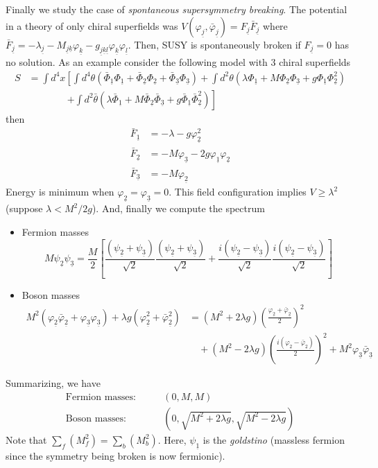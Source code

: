 \documentclass[a4paper,12pt]{article}
\numberwithin{equation}{section}
\numberwithin{exe}{section}
\newcommand{\Fb}{{\bar F}}
\newcommand{\ju}{{\underline j}}
\newcommand{\ku}{{\underline k}}
\newcommand{\lu}{{\underline l}}
\renewcommand{\u}[1]{{\underline #1}}
\renewcommand{\l}{{\lambda}}
\renewcommand{\t}{{\theta}}
\newcommand{\tb}{{\bar\theta}}
\newcommand{\vphi}{{\varphi}}
\newcommand{\vphib}{{\bar\varphi}}
\newcommand{\Phib}{{\bar \Phi}}
\begin{document}
Finally we study the case of {\it spontaneous supersymmetry breaking}. The potential in a theory of only chiral superfields was $V(\vphi_\ju,\vphib_\ju) = F_\ju \Fb_\ju$ where $\Fb_\ju = -\l_\ju - M_{\ju\ku}\vphi_\ku - g_{\ju\ku\lu}\vphi_\ku\vphi_\lu$. Then, SUSY is spontaneously broken if $F_\ju = 0$ has no solution. As an example consider the following model with 3 chiral superfields
	\begin{align}
	S & = \int d^4x \left[ \int d^4\t (\Phib_\u1\Phi_\u1 + \Phib_\u2 \Phi_\u2 + \Phib_\u3 \Phi_\u3 ) + \int d^2\t(\l\Phi_\u1 + M\Phi_\u2\Phi_\u3 + g \Phi_\u1\Phi_\u2^2)\right. \nonumber \\
	& \qquad\qquad \left. + \int d^2\tb(\l\Phib_\u1 + M\Phib_\u2\Phib_\u3 + g \Phib_\u1\Phib_\u2^2) \right]
	\end{align}
then
	\begin{equation}
		\begin{aligned}
		\Fb_\u1 & = -\l-g\vphi^2_\u2 \\
		\Fb_\u2 & = - M\vphi_\u3 -2g\vphi_\u1\vphi_\u2 \\
		\Fb_\u3 & = -M\vphi_\u2
		\end{aligned}
	\end{equation}
Energy is minimum when $\vphi_\u2 = \vphi_\u3 = 0$. This field configuration implies $V\geq \l^2$ (suppose $\l<M^2/2g$). And, finally we compute the spectrum
	\begin{itemize}
	\item Fermion masses
	\begin{equation}
	M\psi_\u2\psi_\u3 = \frac{M}{2}\left[\frac{(\psi_\u2+\psi_\u3)}{\sqrt2}\frac{(\psi_\u2+\psi_\u3)}{\sqrt2} + \frac{i(\psi_\u2-\psi_\u3)}{\sqrt2}\frac{i(\psi_\u2-\psi_\u3)}{\sqrt2}\right]
	\end{equation}
	\item Boson masses
	\begin{equation}
		\begin{aligned}
		M^2(\vphi_\u2 \vphib_\u2 + \vphi_\u3\vphi_\u3) + \l g(\vphi_\u2^2 + \vphib^2_\u2) & = (M^2+2\l g)\left(\frac{\vphi_\u2 + \vphib_\u2}{2}\right)^2 \\
		& \quad + (M^2-2\l g)\left(\frac{i(\vphi_\u2 - \vphib_\u2)}{2}\right)^2 + M^2\vphi_\u3\vphib_\u3
		\end{aligned}
	\end{equation}
	\end{itemize}
Summarizing, we have
	\begin{align}
	\text{Fermion masses:} & \qquad (0,M,M) \\
	\text{Boson masses:} & \qquad (0,\sqrt{M^2 + 2\l g},\sqrt{M^2 - 2\l g})
	\end{align}
Note that $\sum_f (M_f^2) = \sum_b (M_b^2)$. Here, $\psi_\u1$ is the {\it goldstino} (massless fermion since the symmetry being broken is now fermionic).
\end{document}
